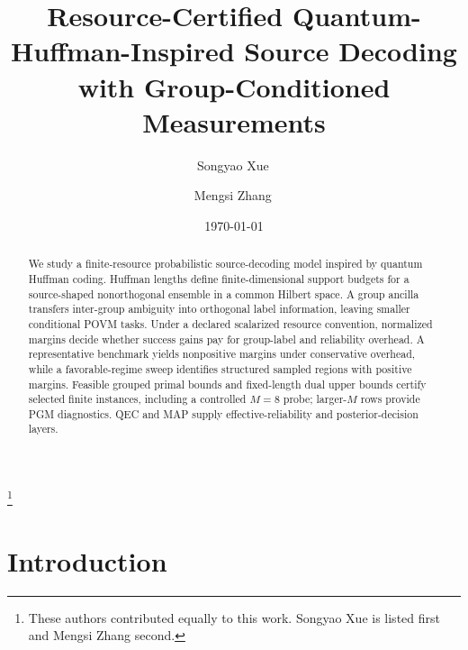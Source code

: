 \documentclass[
 reprint,
 amsmath,amssymb,
 aps,
 pra,
 floatfix,
]{revtex4-2}
\begin{document}

\title{Resource-Certified Quantum-Huffman-Inspired Source Decoding with Group-Conditioned Measurements}

\author{
    Songyao Xue\,
}

\author{
    Mengsi Zhang\,
}
\thanks{These authors contributed equally to this work. Songyao Xue is listed first and Mengsi Zhang second.}

\date{\today}

\begin{abstract}
We study a finite-resource probabilistic source-decoding model inspired by quantum Huffman coding. Huffman lengths define finite-dimensional support budgets for a source-shaped nonorthogonal ensemble in a common Hilbert space. A group ancilla transfers inter-group ambiguity into orthogonal label information, leaving smaller conditional POVM tasks. Under a declared scalarized resource convention, normalized margins decide whether success gains pay for group-label and reliability overhead. A representative benchmark yields nonpositive margins under conservative overhead, while a favorable-regime sweep identifies structured sampled regions with positive margins. Feasible grouped primal bounds and fixed-length dual upper bounds certify selected finite instances, including a controlled \(M=8\) probe; larger-\(M\) rows provide PGM diagnostics. QEC and MAP supply effective-reliability and posterior-decision layers.
\end{abstract}

\maketitle



\section{Introduction}
\end{document}
